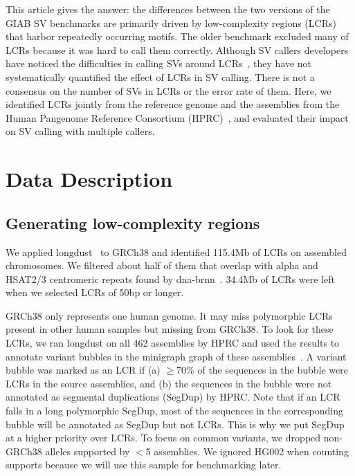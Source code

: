 \documentclass[a4paper,num-refs]{oup-contemporary}
\begin{document}
This article gives the answer:
the differences between the two versions of the GIAB SV benchmarks
are primarily driven by low-complexity regions (LCRs) that harbor repeatedly occurring motifs.
The older benchmark excluded many of LCRs because it was hard to call them correctly.
Although SV callers developers have noticed the difficulties in calling SVs around LCRs~\cite{Zook:2020aa,Smolka:2024ab,Keskus:2025aa},
they have not systematically quantified the effect of LCRs in SV calling.
There is not a consensus on the number of SVs in LCRs or the error rate of them.
Here, we identified LCRs jointly from the reference genome
and the assemblies from the Human Pangenome Reference Consortium (HPRC)~\cite{Liao:2023aa},
and evaluated their impact on SV calling with multiple callers.


\section{Data Description}

\subsection{Generating low-complexity regions}

We applied longdust~\cite{Li:2025aa} to GRCh38 and identified 115.4Mb of LCRs on assembled chromosomes.
We filtered about half of them that overlap with alpha and HSAT2/3 centromeric repeats found by dna-brnn~\cite{Li:2019aa}.
34.4Mb of LCRs were left when we selected LCRs of 50bp or longer.

GRCh38 only represents one human genome.
It may miss polymorphic LCRs present in other human samples but missing from GRCh38.
To look for these LCRs, we ran longdust on all 462 assemblies by HPRC
and used the results to annotate variant bubbles in the minigraph graph of these assemblies~\cite{Li:2020aa}.
A variant bubble was marked as an LCR if (a) $\ge$70\% of the sequences in the bubble were LCRs in the source assemblies, and
(b) the sequences in the bubble were not annotated as segmental duplications (SegDup) by HPRC.
Note that if an LCR falls in a long polymorphic SegDup, most of the sequences in the corresponding bubble will be annotated as SegDup but not LCRs.
This is why we put SegDup at a higher priority over LCRs.
To focus on common variants, we dropped non-GRCh38 alleles supported by $<$5 assemblies.
We ignored HG002 when counting supports because we will use this sample for benchmarking later.
\end{document}
